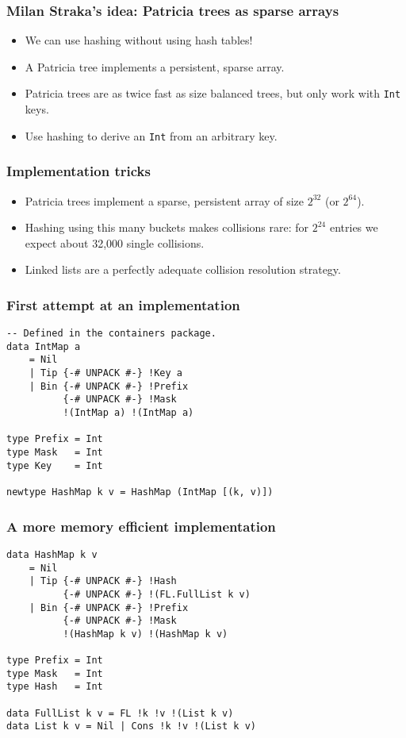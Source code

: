 \documentclass[xetex,mathserif,serif]{beamer}
\begin{document}
\begin{frame}
  \frametitle{Milan Straka's idea: Patricia trees as sparse arrays}
  \begin{itemize}
  \item We can use hashing without using hash tables!
  \item A Patricia tree implements a persistent, sparse array.
  \item Patricia trees are as twice fast as size balanced trees, but
    only work with \lstinline!Int! keys.
  \item Use hashing to derive an \lstinline!Int! from an arbitrary
    key.
  \end{itemize}
\end{frame}

\begin{frame}
  \frametitle{Implementation tricks}
  \begin{itemize}
  \item Patricia trees implement a sparse, persistent array of size
    $2^{32}$ (or $2^{64}$).
  \item Hashing using this many buckets makes collisions rare: for
    $2^{24}$ entries we expect about 32,000 single collisions.
  \item Linked lists are a perfectly adequate collision resolution
    strategy.
  \end{itemize}
\end{frame}

\begin{frame}[fragile]
  \frametitle{First attempt at an implementation}
  \begin{lstlisting}
-- Defined in the containers package.
data IntMap a
    = Nil
    | Tip {-# UNPACK #-} !Key a
    | Bin {-# UNPACK #-} !Prefix
          {-# UNPACK #-} !Mask
          !(IntMap a) !(IntMap a)

type Prefix = Int
type Mask   = Int
type Key    = Int

newtype HashMap k v = HashMap (IntMap [(k, v)])
  \end{lstlisting}
\end{frame}


\begin{frame}[fragile]
  \frametitle{A more memory efficient implementation}
  \begin{lstlisting}
data HashMap k v
    = Nil
    | Tip {-# UNPACK #-} !Hash
          {-# UNPACK #-} !(FL.FullList k v)
    | Bin {-# UNPACK #-} !Prefix
          {-# UNPACK #-} !Mask
          !(HashMap k v) !(HashMap k v)

type Prefix = Int
type Mask   = Int
type Hash   = Int

data FullList k v = FL !k !v !(List k v)
data List k v = Nil | Cons !k !v !(List k v)
  \end{lstlisting}
\end{frame}
\end{document}
